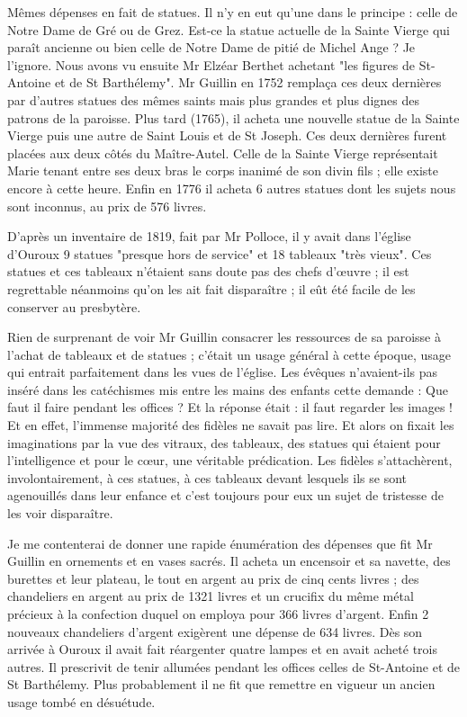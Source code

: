 Mêmes dépenses en fait de statues. Il n'y en eut qu'une dans le principe : celle de Notre Dame de Gré ou de Grez. Est-ce la statue actuelle de la Sainte Vierge qui paraît ancienne ou bien celle de Notre Dame de pitié de Michel Ange ? Je l'ignore. Nous avons vu ensuite Mr Elzéar Berthet achetant "les figures de St-Antoine et de St Barthélemy". Mr Guillin en 1752 remplaça ces deux dernières par d'autres statues des mêmes saints mais plus grandes et plus dignes des patrons de la paroisse. Plus tard (1765), il acheta une nouvelle statue de la Sainte Vierge puis une autre de Saint Louis et de St Joseph. Ces deux dernières furent placées aux deux côtés du Maître-Autel. Celle de la Sainte Vierge représentait Marie tenant entre ses deux bras le corps inanimé de son divin fils ; elle existe encore à cette heure. Enfin en 1776 il acheta 6 autres statues dont les sujets nous sont inconnus, au prix de 576 livres.

D'après un inventaire de 1819, fait par Mr Polloce, il y avait dans l'église d'Ouroux 9 statues "presque hors de service" et 18 tableaux "très vieux". Ces statues et ces tableaux n'étaient sans doute pas des chefs d'œuvre ; il est regrettable néanmoins qu'on les ait fait disparaître ; il eût été facile de les conserver au presbytère.

Rien de surprenant de voir Mr Guillin consacrer les ressources de sa paroisse à l'achat de tableaux et de statues ; c'était un usage
général à cette époque, usage qui entrait parfaitement dans les vues de l'église. Les évêques n'avaient-ils pas inséré dans les catéchismes mis entre les mains des enfants cette demande : Que faut il faire pendant les offices ? Et la réponse était : il faut regarder les images ! Et en effet, l'immense majorité des fidèles ne savait pas lire. Et alors on fixait les imaginations par la vue des vitraux, des tableaux, des statues qui étaient pour l'intelligence et pour le cœur, une véritable prédication. Les fidèles s'attachèrent, involontairement, à ces statues, à ces tableaux devant lesquels ils se sont agenouillés dans leur enfance et c'est toujours pour eux un sujet de tristesse de les voir disparaître.

Je me contenterai de donner une rapide énumération des dépenses que fit Mr Guillin en ornements et en vases sacrés. Il acheta un encensoir et sa navette, des burettes et leur plateau, le tout en argent au prix de cinq cents livres ; des chandeliers en argent au prix de 1321 livres et un crucifix du même métal précieux à la confection duquel on employa pour 366 livres d'argent. Enfin 2 nouveaux chandeliers d'argent exigèrent une dépense de 634 livres. Dès son arrivée à Ouroux il avait fait réargenter quatre lampes et en avait acheté trois autres. Il prescrivit de tenir allumées pendant les offices celles de St-Antoine et de St Barthélemy. Plus probablement il ne fit que remettre en vigueur un ancien usage tombé en désuétude.

